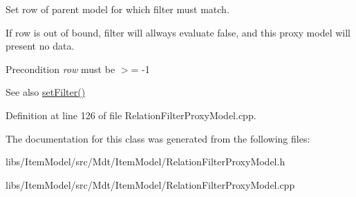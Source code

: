 Set row of parent model for which filter must match. 

If row is out of bound, filter will allways evaluate false, and this proxy model will present no data.

\begin{DoxyPrecond}{Precondition}
{\itshape row} must be $>$= -\/1 
\end{DoxyPrecond}
\begin{DoxySeeAlso}{See also}
\hyperlink{class_mdt_1_1_item_model_1_1_relation_filter_proxy_model_a55c2fc2383af03d01ef92e7eb4ddc426}{set\+Filter()} 
\end{DoxySeeAlso}


Definition at line 126 of file Relation\+Filter\+Proxy\+Model.\+cpp.



The documentation for this class was generated from the following files\+:\begin{DoxyCompactItemize}
\item 
libs/\+Item\+Model/src/\+Mdt/\+Item\+Model/Relation\+Filter\+Proxy\+Model.\+h\item 
libs/\+Item\+Model/src/\+Mdt/\+Item\+Model/Relation\+Filter\+Proxy\+Model.\+cpp\end{DoxyCompactItemize}
